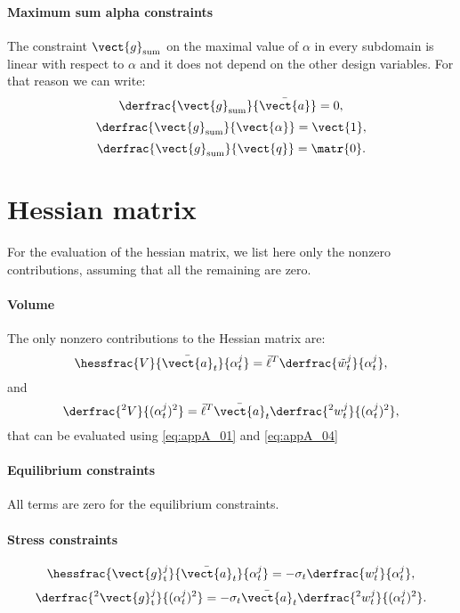 \paragraph*{Maximum sum alpha constraints}
The constraint $\vect{g}_\text{sum}$ on the maximal value of $\alpha$ in every subdomain is linear with respect to $\alpha$ and it does not depend on the other design variables. For that reason we can write:
\begin{equation}
    \derfrac{\vect{g}_\text{sum}}{\bar{\vect{a}}}=0,
\end{equation}
\begin{equation}
    \derfrac{\vect{g}_\text{sum}}{\vect{\alpha}}=\vect{1},
\end{equation}
\begin{equation}
    \derfrac{\vect{g}_\text{sum}}{\vect{q}}=\matr{0}.
\end{equation}

\section{Hessian matrix}
For the evaluation of the hessian matrix, we list here only the nonzero contributions, assuming that all the remaining are zero.
\paragraph*{Volume}
The only nonzero contributions to the Hessian matrix are: 
\begin{equation}
    \hessfrac{V}{{\bar{\vect{a}}_t}}{\alpha_t^j} = \bar{\ell}^T \derfrac{\tilde{w}_t^j}{\alpha_t^j},
\end{equation}
and
\begin{equation}
    \derfrac{^2V}{(\alpha_t^j)^2} = \bar{\ell}^T \bar{\vect{a}}_t \derfrac{^2w_t^j}{(\alpha_t^j)^2},
\end{equation}
that can be evaluated using \eqref{eq:appA_01} and \eqref{eq:appA_04}
\paragraph*{Equilibrium constraints}
All terms are zero for the equilibrium constraints.
\paragraph*{Stress constraints}
\begin{equation}
    \hessfrac{\vect{g}_\text{t}^j}{{\bar{\vect{a}}_t}}{\alpha_t^j} = -\sigma_t \derfrac{w_t^j}{\alpha_t^j},
\end{equation}
\begin{equation}
    \derfrac{^2\vect{g}_\text{t}^j}{(\alpha_t^j)^2} = -\sigma_t  \bar{\vect{a}}_t \derfrac{^2w_t^j}{(\alpha_t^j)^2}.
\end{equation}
